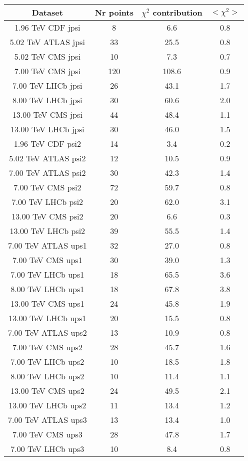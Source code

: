 \begin{table}[h!]
\centering
\begin{tabular}{c|c|c|c}
Dataset & Nr points & $\chi^2$ contribution & $<\chi^2>$ \\
\hline
1.96 TeV CDF jpsi & 8 & 6.6 & 0.8 \\
5.02 TeV ATLAS jpsi & 33 & 25.5 & 0.8 \\
5.02 TeV CMS jpsi & 10 & 7.3 & 0.7 \\
7.00 TeV CMS jpsi & 120 & 108.6 & 0.9 \\
7.00 TeV LHCb jpsi & 26 & 43.1 & 1.7 \\
8.00 TeV LHCb jpsi & 30 & 60.6 & 2.0 \\
13.00 TeV CMS jpsi & 44 & 48.4 & 1.1 \\
13.00 TeV LHCb jpsi & 30 & 46.0 & 1.5 \\
1.96 TeV CDF psi2 & 14 & 3.4 & 0.2 \\
5.02 TeV ATLAS psi2 & 12 & 10.5 & 0.9 \\
7.00 TeV ATLAS psi2 & 30 & 42.3 & 1.4 \\
7.00 TeV CMS psi2 & 72 & 59.7 & 0.8 \\
7.00 TeV LHCb psi2 & 20 & 62.0 & 3.1 \\
13.00 TeV CMS psi2 & 20 & 6.6 & 0.3 \\
13.00 TeV LHCb psi2 & 39 & 55.5 & 1.4 \\
7.00 TeV ATLAS ups1 & 32 & 27.0 & 0.8 \\
7.00 TeV CMS ups1 & 30 & 39.0 & 1.3 \\
7.00 TeV LHCb ups1 & 18 & 65.5 & 3.6 \\
8.00 TeV LHCb ups1 & 18 & 67.8 & 3.8 \\
13.00 TeV CMS ups1 & 24 & 45.8 & 1.9 \\
13.00 TeV LHCb ups1 & 20 & 15.5 & 0.8 \\
7.00 TeV ATLAS ups2 & 13 & 10.9 & 0.8 \\
7.00 TeV CMS ups2 & 28 & 45.7 & 1.6 \\
7.00 TeV LHCb ups2 & 10 & 18.5 & 1.8 \\
8.00 TeV LHCb ups2 & 10 & 11.4 & 1.1 \\
13.00 TeV CMS ups2 & 24 & 49.5 & 2.1 \\
13.00 TeV LHCb ups2 & 11 & 13.4 & 1.2 \\
7.00 TeV ATLAS ups3 & 13 & 13.4 & 1.0 \\
7.00 TeV CMS ups3 & 28 & 47.8 & 1.7 \\
7.00 TeV LHCb ups3 & 10 & 8.4 & 0.8 \\

\end{tabular}
\end{table}
